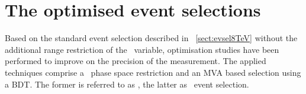 \section{The optimised event selections}
\label{sect:opti}
Based on the standard event selection described in \sect~\ref{sect:evsel8TeV} without the additional range restriction of the \mlb\ variable, optimisation studies have been performed to improve on the precision of the measurement. 
%
The applied techniques comprise a \oned\ phase space restriction and an \gls{MVA} based selection using a \gls{BDT}. 
%
The former is referred to as \cutbased, the latter as \mvabased\ event selection.
%
\begin{figure}[tb!]
\centering
{}
\end{figure}
